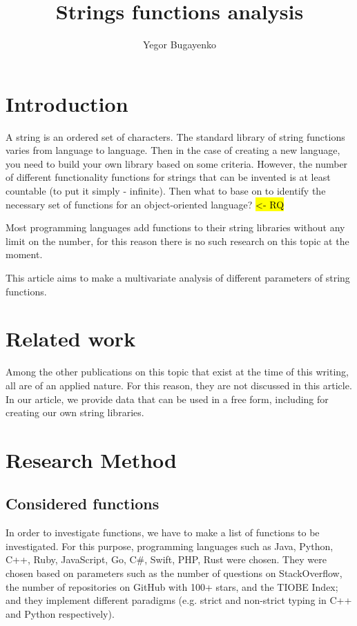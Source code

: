 \documentclass[anonymous,sigplan,review,11pt,nonacm,natbib=false]{acmart}
\title{Strings functions analysis}
\author{Yegor Bugayenko}
\affiliation{Huawei\city{Moscow}\country{Russia}}
\begin{document}
    \raggedbottom

    \begin{abstract}
    \end{abstract}

    \maketitle

    \section{Introduction}\label{sec:intro}

    A string is an ordered set of characters. The standard library of string functions varies from language to language. Then in the case of creating a new language, you need to build your own library based on some criteria. However, the number of different functionality functions for strings that can be invented is at least countable (to put it simply - infinite). Then what to base on to identify the necessary set of functions for an object-oriented language? \hl{<- RQ}

    Most programming languages add functions to their string libraries without any limit on the number, for this reason there is no such research on this topic at the moment.

    This article aims to make a multivariate analysis of different parameters of string functions.

    \section{Related work}

    Among the other publications on this topic that exist at the time of this writing, all are of an applied nature. For this reason, they are not discussed in this article. In our article, we provide data that can be used in a free form, including for creating our own string libraries.

    \section{Research Method}

    \subsection{Considered functions}

    In order to investigate functions, we have to make a list of functions to be investigated. For this purpose, programming languages such as Java, Python, C++, Ruby, JavaScript, Go, C\#, Swift, PHP, Rust were chosen. They were chosen based on parameters such as the number of questions on StackOverflow, the number of repositories on GitHub with 100+ stars, and the TIOBE Index; and they implement different paradigms (e.g. strict and non-strict typing in C++ and Python respectively).
\end{document}
